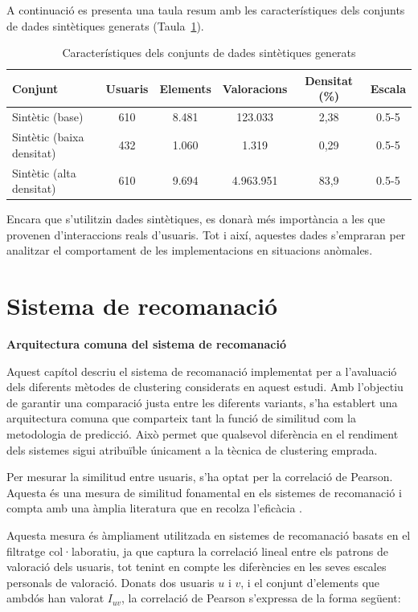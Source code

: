\documentclass[a4paper,12pt]{report}
\begin{document}
A continuació es presenta una taula resum amb les característiques dels conjunts de dades sintètiques generats (Taula~\ref{tab:datasets_synthetic}).

\begin{table}[H]
    \centering
    \begin{tabular}{|l|c|c|c|c|c|}
    \hline
    \textbf{Conjunt} & \textbf{Usuaris} & \textbf{Elements} & \textbf{Valoracions} & \textbf{Densitat (\%)} & \textbf{Escala} \\ \hline
    Sintètic (base) & 610   & 8.481 & 123.033 & 2,38 & 0.5-5  \\ \hline
    Sintètic (baixa densitat) & 432   & 1.060 & 1.319  & 0,29 & 0.5-5 \\ \hline
    Sintètic (alta densitat)        & 610   & 9.694 & 4.963.951 & 83,9 & 0.5-5 \\ \hline
    \end{tabular}
    \caption{Característiques dels conjunts de dades sintètiques generats}
    \label{tab:datasets_synthetic}
\end{table}

Encara que s’utilitzin dades sintètiques, es donarà més importància a les que provenen d’interaccions reals d’usuaris. Tot i així, aquestes dades s’empraran per analitzar el comportament de les implementacions en situacions anòmales.

\chapter{Sistema de recomanació}

\textbf{Arquitectura comuna del sistema de recomanació}

Aquest capítol descriu el sistema de recomanació implementat per a l’avaluació dels diferents mètodes de clustering considerats en aquest estudi. Amb l’objectiu de garantir una comparació justa entre les diferents variants, s’ha establert una arquitectura comuna que comparteix tant la funció de similitud com la metodologia de predicció. Això permet que qualsevol diferència en el rendiment dels sistemes sigui atribuïble únicament a la tècnica de clustering emprada.

Per mesurar la similitud entre usuaris, s’ha optat per la correlació de Pearson. Aquesta és una mesura de similitud fonamental en els sistemes de recomanació i compta amb una àmplia literatura que en recolza l’eficàcia \cite{chowdhury2024evaluating}.

Aquesta mesura és àmpliament utilitzada en sistemes de recomanació basats en el filtratge col·laboratiu, ja que captura la correlació lineal entre els patrons de valoració dels usuaris, tot tenint en compte les diferències en les seves escales personals de valoració. Donats dos usuaris \( u \) i \( v \), i el conjunt d’elements que ambdós han valorat \( I_{uv} \), la correlació de Pearson s’expressa de la forma següent:
\end{document}
